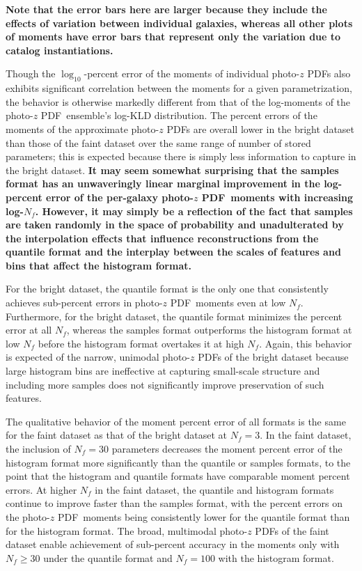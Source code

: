 \documentclass[\docopts]{\docclass}
\newcommand{\pz}{photo-$z$ PDF}
\newcommand{\mgdata}{bright\xspace}
\newcommand{\ssdata}{faint\xspace}
\begin{document}
\textbf{Note that the error bars here are larger because they include the 
effects of variation between individual galaxies, whereas all other plots of 
moments have error bars that represent only the variation due to catalog 
instantiations.}

Though the $\log_{10}$-percent error of the moments of individual \pz s also 
exhibits significant correlation between the moments for a given 
parametrization, the behavior is otherwise markedly different from that of the 
log-moments of the \pz\ ensemble's log-KLD distribution.
The percent errors of the moments of the approximate \pz s are overall lower in 
the \mgdata dataset than those of the \ssdata dataset over the same range of 
number of stored parameters; this is expected because there is simply less 
information to capture in the \mgdata dataset.
\textbf{It may seem somewhat surprising that the samples format has an 
unwaveringly linear marginal improvement in the log-percent error of the 
per-galaxy \pz\ moments with increasing log-$N_{f}$.
However, it may simply be a reflection of the fact that samples are taken 
randomly in the space of probability and unadulterated by the interpolation 
effects that influence reconstructions from the quantile format and the 
interplay between the scales of features and bins that affect the histogram 
format.}

For the \mgdata dataset, the quantile format is the only one that consistently 
achieves sub-percent errors in \pz\ moments even at low $N_{f}$.
Furthermore, for the \mgdata dataset, the quantile format minimizes the percent 
error at all $N_{f}$, whereas the samples format outperforms the histogram 
format at low $N_{f}$ before the histogram format overtakes it at high $N_{f}$.
Again, this behavior is expected of the narrow, unimodal \pz s of the \mgdata 
dataset because large histogram bins are ineffective at capturing small-scale 
structure and including more samples does not significantly improve 
preservation of such features.

The qualitative behavior of the moment percent error of all formats is the same 
for the \ssdata dataset as that of the \mgdata dataset at $N_{f}=3$.
In the \ssdata dataset, the inclusion of $N_{f}=30$ parameters decreases the 
moment percent error of the histogram format more significantly than the 
quantile or samples formats, to the point that the histogram and quantile 
formats have comparable moment percent errors.
At higher $N_{f}$ in the \ssdata dataset, the quantile and histogram formats 
continue to improve faster than the samples format, with the percent errors on 
the \pz\ moments being consistently lower for the quantile format than for the 
histogram format.
The broad, multimodal \pz s of the \ssdata dataset enable achievement of 
sub-percent accuracy in the moments only with $N_{f}\geq30$ under the quantile 
format and $N_{f}=100$ with the histogram format.
\end{document}
